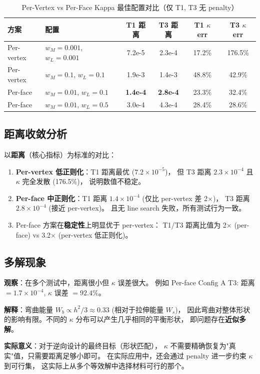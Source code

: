 \documentclass[12pt,a4paper]{article}
\begin{document}
\begin{table}[H]
\centering
\caption{Per-Vertex vs Per-Face Kappa 最佳配置对比（仅 T1, T3 无 penalty）}
\begin{tabular}{llcccc}
\toprule
方案 & 配置 & T1 距离 & T3 距离 & T1 $\kappa$ err & T3 $\kappa$ err \\
\midrule
Per-vertex & $w_M\!=\!0.001$, $w_L\!=\!0.001$ & 7.2e-5 & 2.3e-4 & 17.2\% & 176.5\% \\
Per-vertex & $w_M\!=\!0.1$, $w_L\!=\!0.1$ & 1.9e-3 & 1.4e-3 & 48.8\% & 42.9\% \\
\midrule
Per-face & $w_M\!=\!0.01$, $w_L\!=\!0.1$ & \textbf{1.4e-4} & \textbf{2.8e-4} & 23.3\% & 32.4\% \\
Per-face & $w_M\!=\!0.01$, $w_L\!=\!0.5$ & 3.0e-4 & 4.3e-4 & 28.4\% & 28.6\% \\
\bottomrule
\end{tabular}
\end{table}

\subsection{距离收敛分析}

以\textbf{距离}（核心指标）为标准的对比：

\begin{enumerate}
    \item \textbf{Per-vertex 低正则化}：T1 距离最优 ($7.2 \times 10^{-5}$)，
    但 T3 距离 $2.3 \times 10^{-4}$ 且 $\kappa$ 完全发散 (176.5\%)，
    说明数值不稳定。

    \item \textbf{Per-face 中正则化}：T1 距离 $1.4 \times 10^{-4}$ (仅比 per-vertex 差 2$\times$)，
    T3 距离 $2.8 \times 10^{-4}$ (接近 per-vertex)。
    且无 line search 失败，所有测试行为一致。

    \item Per-face 方案在\textbf{稳定性}上明显优于 per-vertex：
    T1/T3 距离比值为 2$\times$ (per-face) vs 3.2$\times$ (per-vertex 低正则化)。
\end{enumerate}

\subsection{多解现象}

\begin{framed}
\noindent\textbf{观察}：在多个测试中，距离很小但 $\kappa$ 误差很大。
例如 Per-face Config A T3: 距离 $= 1.7 \times 10^{-4}$, $\kappa$ 误差 $= 92.4\%$。

\textbf{解释}：弯曲能量 $W_b \propto h^2/3 \approx 0.33$ (相对于拉伸能量 $W_s$)，
因此弯曲对整体形状的影响有限。不同的 $\kappa$ 分布可以产生几乎相同的平衡形状，
即问题存在\textbf{近似多解}。

\textbf{实际意义}：对于逆向设计的最终目标（形状匹配），
$\kappa$ 不需要精确恢复为"真实"值，只需要距离足够小即可。
在实际应用中，还会通过 penalty 进一步约束 $\kappa$ 到可行集，
这实际上从多个等效解中选择材料可行的那个。
\end{framed}
\end{document}
